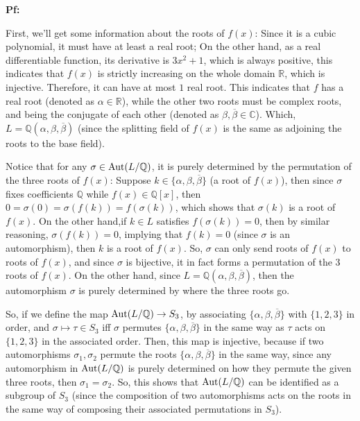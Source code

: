 \documentclass{article}
\begin{document}
\textbf{Pf:}

First, we'll get some information about the roots of $f(x)$: Since it is a cubic polynomial, it must have at least a real root; On the other hand, as a real differentiable function, its derivative is $3x^2+1$, which is always positive, this indicates that $f(x)$ is strictly increasing on the whole domain $\mathbb{R}$, which is injective. Therefore, it can have at most $1$ real root. This indicates that $f$ has a real root (denoted as $\alpha\in\mathbb{R}$), while the other two roots must be complex roots, and being the conjugate of each other (denoted as $\beta,\overline{\beta}\in\mathbb{C}$). Which, $L=\mathbb{Q}(\alpha,\beta,\overline{\beta})$ (since the splitting field of $f(x)$ is the same as adjoining the roots to the base field).

\hfil

Notice that for any $\sigma\in\textmd{Aut}(L/\mathbb{Q})$, it is purely determined by the permutation of the three roots of $f(x)$: Suppose $k\in\{\alpha,\beta,\overline{\beta}\}$ (a root of $f(x)$), then since $\sigma$ fixes coefficients $\mathbb{Q}$ while $f(x)\in\mathbb{Q}[x]$, then $0=\sigma(0)=\sigma(f(k)) = f(\sigma(k))$, which shows that $\sigma(k)$ is a root of $f(x)$. On the other hand,if $k\in L$ satisfies $f(\sigma(k))=0$, then by similar reasoning, $\sigma(f(k))=0$, implying that $f(k)=0$ (since $\sigma$ is an automorphism), then $k$ is a root of $f(x)$. So, $\sigma$ can only send roots of $f(x)$ to roots of $f(x)$, and since $\sigma$ is bijective, it in fact forms a permutation of the $3$ roots of $f(x)$. On the other hand, since $L=\mathbb{Q}(\alpha,\beta,\overline{\beta})$, then the automorphism $\sigma$ is purely determined by where the three roots go.

So, if we define the map $\textmd{Aut}(L/\mathbb{Q})\rightarrow S_3$, by associating $\{\alpha,\beta,\overline{\beta}\}$ with $\{1,2,3\}$ in order, and $\sigma\mapsto \tau\in S_3$ iff $\sigma$ permutes $\{\alpha,\beta,\overline{\beta}\}$ in the same way as $\tau$ acts on $\{1,2,3\}$ in the associated order. Then, this map is injective, because if two automorphisms $\sigma_1,\sigma_2$ permute the roots $\{\alpha,\beta,\overline{\beta}\}$ in the same way, since any automorphism in $\textmd{Aut}(L/\mathbb{Q})$ is purely determined on how they permute the given three roots, then $\sigma_1=\sigma_2$. So, this shows that $\textmd{Aut}(L/\mathbb{Q})$ can be identified as a subgroup of $S_3$ (since the composition of two automorphisms acts on the roots in the same way of composing their associated permutations in $S_3$).
\end{document}

